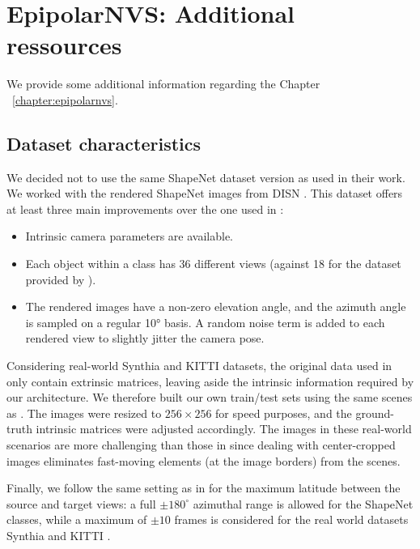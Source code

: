 \chapter{EpipolarNVS: Additional ressources}
\label{annex:epipolarnvs}

We provide some additional information regarding the Chapter ~\ref{chapter:epipolarnvs}. 

\section{Dataset characteristics}
\label{annex:epipolarnvs-dataset}

We decided not to use the same ShapeNet dataset version as \citep{kim2020novel, sun2018multiview} used in their work. We worked with the rendered ShapeNet images from DISN \citep{xu2019disn}. This dataset offers at least three main improvements over the one used in \citep{kim2020novel,sun2018multiview}:

\begin{itemize}
    \item Intrinsic camera parameters are available. 
    \item Each object within a class has 36 different views (against 18 for the dataset provided by \cite{kim2020novel,sun2018multiview}). 
    \item The rendered images have a non-zero elevation angle, and the azimuth angle is sampled on a regular 10° basis. A random noise term is added to each rendered view to slightly jitter the camera pose. 
\end{itemize}

Considering real-world Synthia \citep{ros2016synthia} and KITTI \citep{geiger2012we} datasets, the original data used in \citep{kim2020novel} only contain extrinsic matrices, leaving aside the intrinsic information required by our architecture. We therefore built our own train/test sets using the same scenes as \citep{kim2020novel}. The images were resized to $256\times256$ for speed purposes, and the ground-truth intrinsic matrices were adjusted accordingly. The images in these real-world scenarios are more challenging than those in \citep{kim2020novel,sun2018multiview} since dealing with center-cropped images eliminates fast-moving elements (at the image borders) from the scenes.

Finally, we follow the same setting as in \citep{kim2020novel} for the maximum latitude between the source and target views: a full $\pm 180^{\circ}$ azimuthal range is allowed for the ShapeNet classes, while a maximum of $\pm 10$ frames is considered for the real world datasets Synthia \citep{ros2016synthia} and KITTI \citep{geiger2012we}.

